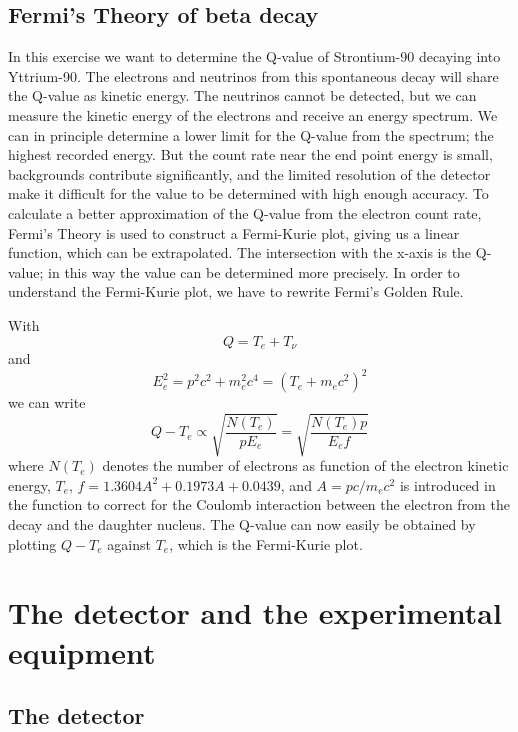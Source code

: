 \documentclass[a4,11pt, notitlepage]{article}
\begin{document}
\subsection{Fermi's Theory of beta decay}

In this exercise we want to determine the Q-value of Strontium-90
decaying into Yttrium-90. The electrons and neutrinos from this
spontaneous decay will share the Q-value as kinetic energy. The
neutrinos cannot be detected, but we can measure the kinetic energy of
the electrons and receive an energy spectrum. We can in principle
determine a lower limit for the Q-value from the spectrum; the highest recorded
energy. But the count rate near the end point energy is small,
backgrounds contribute significantly, and the limited resolution of the detector
make it difficult for the value to be determined with high enough
accuracy. To calculate a better approximation of the Q-value from the
electron count rate, Fermi's Theory is used to construct a
Fermi-Kurie plot, giving us a linear function, which can be
extrapolated. The intersection with the x-axis is the Q-value; in this
way the value can be determined more precisely. In order to understand
the Fermi-Kurie plot, we have to rewrite Fermi's Golden Rule.

With
\begin{equation}
Q=T_e + T_{\nu}
\end{equation} 
and
\begin{equation}
E_e^2 = p^2c^2+m_e^2c^4=(T_e+m_ec^2)^2
\end{equation} 
we can write
\begin{equation}
Q-T_e \propto \sqrt{\frac{N(T_e)}{pE_e}} = \sqrt{\frac{N(T_e)p}{E_ef}}
\label{eq:f}
\end{equation}
where $N(T_e)$ denotes the number of electrons as function of the
electron kinetic energy, $T_e$, $f=1.3604A^2+0.1973A+0.0439$, and $A=pc/m_ec^2$ is introduced in the function to correct for the Coulomb interaction between the electron from the decay and the daughter nucleus. 
The Q-value can now easily be obtained by plotting $Q-T_e$ against $T_e$, which is the Fermi-Kurie plot.



\section{The detector and the experimental equipment}

\subsection{The detector}
\end{document}
